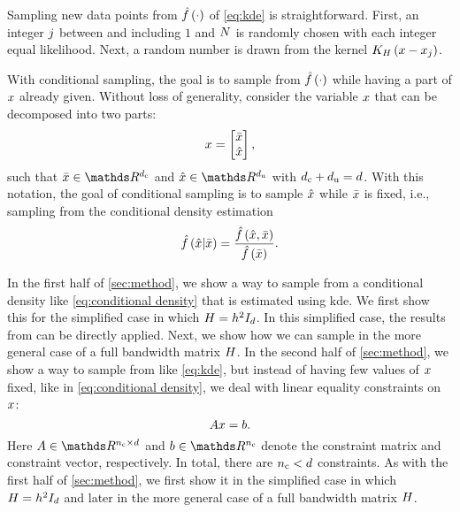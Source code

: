 Sampling new data points from $\hat{f}\left( \cdot \right)$ of \cref{eq:kde} is straightforward.
First, an integer $j$ between and including $1$ and $N$ is randomly chosen with each integer equal likelihood. 
Next, a random number is drawn from the kernel $K_{H} \left( x - x_{j} \right)$.

With conditional sampling, the goal is to sample from $\hat{f}\left( \cdot \right)$ while having a part of $x$ already given. 
Without loss of generality, consider the variable $x$ that can be decomposed into two parts:
\begin{equation}
	\label{eq:decomposition}
	x = \begin{bmatrix}
		\bar{x} \\ \hat{x}
	\end{bmatrix},
\end{equation}
such that $\variableparta \in \realnumbers^{\dimensionparta}$ and $\variablepartb \in \realnumbers^{\dimensionpartb}$ with $d_\mathrm{c} + d_\mathrm{u} = d$.
With this notation, the goal of conditional sampling is to sample $\hat{x}$ while $\bar{x}$ is fixed, i.e., sampling from the conditional density estimation
\begin{equation}
	\label{eq:conditional density}
	\hat{f}\left(  \hat{x} | \bar{x}  \right)
	= \frac{\hat{f}\left( \hat{x}, \bar{x} \right)}{\hat{f}\left( \bar{x} \right)}.
\end{equation}

In the first half of \cref{sec:method}, we show a way to sample from a conditional density like \cref{eq:conditional density} that is estimated using \ac{kde}. 
We first show this for the simplified case in which $H=h^2 I_{d}$. 
In this simplified case, the results from \textcite{hyndman1996estimating, holmes2007fast} can be directly applied.
Next, we show how we can sample in the more general case of a full bandwidth matrix $H$.
In the second half of \cref{sec:method}, we show a way to sample from  like \cref{eq:kde}, but instead of having few values of $x$ fixed, like in \cref{eq:conditional density}, we deal with linear equality constraints on $x$:
\begin{equation}
	\label{eq:linear constraint}
	A x = b.
\end{equation}
Here $\constraintmatrix \in \realnumbers^{\numberofconstraints \times \dimension}$ and $\constraintvector \in \realnumbers^{\numberofconstraints}$ denote the constraint matrix and constraint vector, respectively. 
In total, there are $n_\mathrm{c} < d$ constraints.
As with the first half of \cref{sec:method}, we first show it in the simplified case in which $H=h^2 I_{d}$ and later in the more general case of a full bandwidth matrix $H$.

